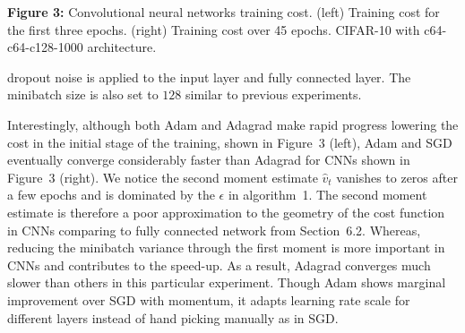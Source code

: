 \documentclass[11pt]{article}
\begin{document}
\vspace{1em}

\noindent
\begin{center}
\end{center}
\vspace{0.3em}
\begin{center}
\textbf{Figure 3:} Convolutional neural networks training cost.
(left) Training cost for the first three epochs. (right)
Training cost over 45 epochs. CIFAR-10 with c64-c64-c128-1000
architecture.
\end{center}

\vspace{1em}

\noindent
dropout noise is applied to the input layer and fully connected
layer. The minibatch size is also set to $128$ similar to
previous experiments.

Interestingly, although both Adam and Adagrad make rapid
progress lowering the cost in the initial stage of the training,
shown in Figure~3 (left), Adam and SGD eventually converge
considerably faster than Adagrad for CNNs shown in Figure~3
(right). We notice the second moment estimate $\widehat{v}_t$
vanishes to zeros after a few epochs and is dominated by the
$\epsilon$ in algorithm~1. The second moment estimate is
therefore a poor approximation to the geometry of the cost
function in CNNs comparing to fully connected network from
Section~6.2. Whereas, reducing the minibatch variance through
the first moment is more important in CNNs and contributes to
the speed-up. As a result, Adagrad converges much slower than
others in this particular experiment. Though Adam shows marginal
improvement over SGD with momentum, it adapts learning rate
scale for different layers instead of hand picking manually as
in SGD.
\end{document}
